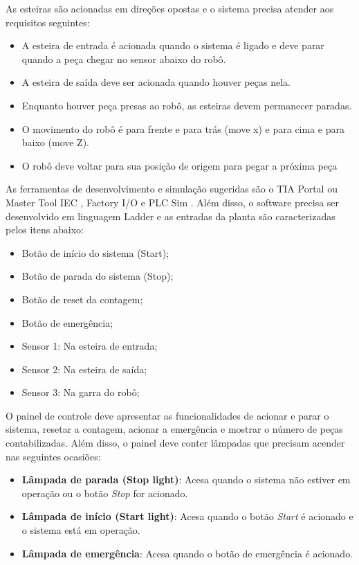 \documentclass[
	12pt,				%
	openright,			%
	oneside,			%
	a4paper,			%
	english,			%
	brazil,				%
	]{abntex2}
\begin{document}
As esteiras são acionadas em direções opostas e o sistema precisa atender aos requisitos seguintes:

\begin{itemize}
    \item A esteira de entrada é acionada quando o sistema é ligado e deve
    parar quando a peça chegar no sensor abaixo do robô.
    \item A esteira de saída deve ser acionada quando houver peças nela.
    \item Enquanto houver peça presas ao robô, as esteiras devem permanecer
    paradas.
    \item O movimento do robô é para frente e para trás (move x) e para cima e
    para baixo (move Z).
    \item O robô deve voltar para sua posição de origem para pegar a próxima peça
\end{itemize}

As ferramentas de desenvolvimento e simulação sugeridas são o TIA Portal ou Master Tool IEC \cite{mastertool2009}, Factory I/O \cite{factoryio} e PLC Sim \cite{plcsim}. Além disso, o software precisa ser desenvolvido em linguagem Ladder e as entradas da planta são caracterizadas pelos itens abaixo:

\begin{itemize}
    \item Botão de início do sistema (Start);
    \item Botão de parada do sistema (Stop);
    \item Botão de reset da contagem;
    \item Botão de emergência;
    \item Sensor 1: Na esteira de entrada;
    \item Sensor 2: Na esteira de saída;
    \item Sensor 3: Na garra do robô;
\end{itemize}

O painel de controle deve apresentar as funcionalidades de acionar e parar o sistema, resetar a contagem, acionar a emergência e mostrar o número de peças contabilizadas. Além disso, o painel deve conter lâmpadas que precisam acender nas seguintes ocasiões:
\begin{itemize}
\item \textbf{Lâmpada de parada (Stop light)}: Acesa quando o sistema não estiver em operação ou o botão \textit{Stop} for acionado.
\item \textbf{Lâmpada de início (Start light)}: Acesa quando o botão \textit{Start} é acionado e o sistema está em operação.
\item \textbf{Lâmpada de emergência}: Acesa quando o botão de emergência é acionado.
\end{itemize}
\end{document}
